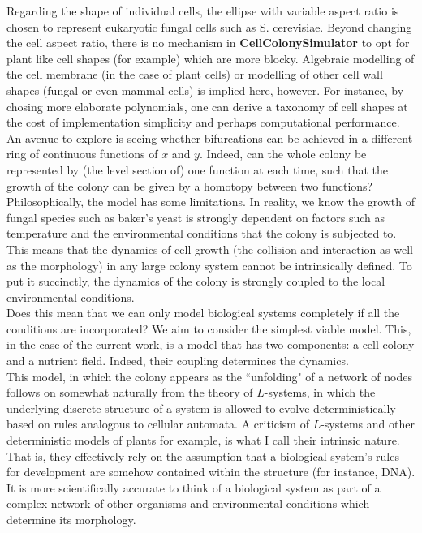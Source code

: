 Regarding the shape of individual cells, 
the ellipse with variable aspect ratio is chosen to represent eukaryotic
fungal cells such as S. cerevisiae. Beyond changing 
the cell aspect ratio, there is no mechanism in \textbf{CellColonySimulator}
to opt for plant like cell shapes (for example) which are more blocky.
Algebraic modelling of the cell membrane (in the case of plant cells) or 
modelling of other cell wall shapes (fungal or even mammal cells)
is implied here, however. For instance, by chosing more elaborate
polynomials, one can derive a taxonomy of cell shapes at the cost of 
implementation simplicity and perhaps computational performance. 
An avenue to explore is seeing whether bifurcations
can be achieved in a different ring of continuous functions of $x$ and $y$.
Indeed, can the whole colony be represented by (the level section of) one function at each time,
such that the growth of the colony can be given by a homotopy 
between two functions?
\\

Philosophically, the model has some limitations. In reality, we know the growth
of fungal species such as baker's yeast is strongly dependent on factors such as temperature
and the environmental conditions that the colony is subjected to. This means 
that the dynamics of cell growth (the collision and interaction as well as the morphology) in 
any large colony system cannot be intrinsically defined. To put it succinctly, the dynamics of 
the colony is strongly coupled to the local environmental conditions.
\\

Does this mean that we can only model biological systems completely if all the conditions 
are incorporated? We aim to consider the simplest viable model. This, in the case of the current work, 
is a model that has two components: a cell colony and 
a nutrient field. Indeed, their coupling determines the dynamics. 
\\

This model, in which the colony appears as the ``unfolding" of a network of nodes
follows on somewhat naturally from the theory of $L$-systems, in which the underlying 
discrete structure of a system is allowed to evolve deterministically based on rules
analogous to cellular automata. A criticism of $L$-systems and other deterministic models
of plants for example, is what I call their intrinsic nature. That is, they effectively
rely on the assumption that a biological system's rules for development are somehow contained
within the structure (for instance, DNA). It is more 
scientifically accurate to think of a biological system as part of a complex network 
of other organisms and environmental conditions which determine its morphology.
\\

